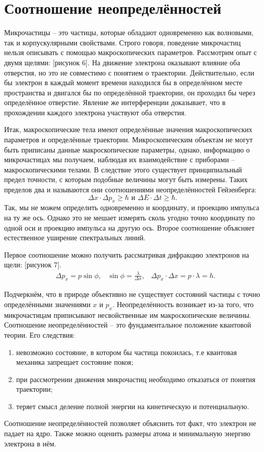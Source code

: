 \section{Соотношение неопределённостей}
Микрочастицы -- это частицы, которые обладают одновременно как волновыми, так и
корпускулярными свойствами. Строго говоря, поведение микрочастиц нельзя
описывать с помощью макроскопических параметров. Рассмотрим опыт с двумя щелями:
[рисунок 6]. На движение электрона оказывают влияние оба отверстия, но это не
совместимо с понятием о траектории. Действительно, если бы электрон в каждый
момент времени находился бы в определённом месте пространства и двигался бы по
определённой траектории, он проходил бы через определённое отверстие. Явление же
интерференции доказывает, что в прохождении каждого электрона участвуют оба
отверстия.

Итак, макроскопические тела имеют определённые значения макроскопических
параметров и определённые траектории. Микроскопическим объектам не могут быть
приписаны данные макроскопические параметры, однако, информацию о микрочастицах
мы получаем, наблюдая их взаимодействие с приборами -- макроскопическими телами.
В следствие этого существует принципиальный предел точности, с которым подобные
величины могут быть измерены. Таких пределов два и называются они соотношениями
неопределённостей Гейзенберга:
\[
    \Delta x \cdot \Delta p_x \ge \hbar \text{ и }
    \Delta E \cdot \Delta t \ge \hbar.
\]
Так, мы не можем определить одновременно и координату, и проекцию импульса на ту
же ось. Однако это не мешает измерять сколь угодно точно координату по одной оси
и проекцию импульса на другую ось. Второе соотношение объясняет естественное
уширение спектральных линий.

Первое соотношение можно получить рассматривая дифракцию электронов на щели:
[рисунок 7].
\begin{align*}
    & \Delta p_x = p \sin\phi,
    & \sin\phi = \frac{\lambda}{\Delta x},
    & \Delta p_x \cdot \Delta x = p \cdot \lambda = h.
\end{align*}

Подчеркнём, что в природе объективно не существует состояний частицы с точно
определёнными значениями \( x \) и \( p_x \). Неопределённость возникает из-за
того, что микрочастицам приписывают несвойственные им макроскопические величины.
Соотношение неопределённостей -- это фундаментальное положение квантовой теории.
Его следствия:
\begin{enumerate}
    \item невозможно состояние, в котором бы частица покоилась, т.е квантовая
        механика запрещает состояние покоя;
    \item при рассмотрении движения микрочастиц необходимо отказаться от
        понятия траектории;
    \item теряет смысл деление полной энергии на кинетическую и потенциальную.
\end{enumerate}

Соотношение неопределённостей позволяет объяснить тот факт, что электрон
не падает на ядро. Также можно оценить размеры атома и минимальную энергию
электрона в нём.

\newpage
